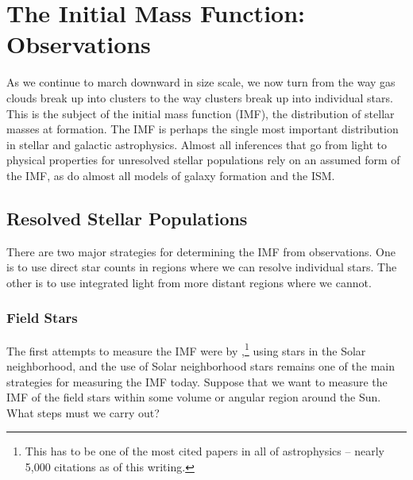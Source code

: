 \chapter{The Initial Mass Function: Observations}
\label{ch:imf_obs}



As we continue to march downward in size scale, we now turn from the way gas clouds break up into clusters to the way clusters break up into individual stars. This is the subject of the initial mass function (IMF), the distribution of stellar masses at formation. The IMF is perhaps the single most important distribution in stellar and galactic astrophysics. Almost all inferences that go from light to physical properties for unresolved stellar populations rely on an assumed form of the IMF, as do almost all models of galaxy formation and the ISM.

\section{Resolved Stellar Populations}

There are two major strategies for determining the IMF from observations. One is to use direct star counts in regions where we can resolve individual stars. The other is to use integrated light from more distant regions where we cannot.

\subsection{Field Stars}

The first attempts to measure the IMF were by \citet{salpeter55a},\footnote{This has to be one of the most cited papers in all of astrophysics -- nearly 5,000 citations as of this writing.} using stars in the Solar neighborhood, and the use of Solar neighborhood stars remains one of the main strategies for measuring the IMF today. Suppose that we want to measure the IMF of the field stars within some volume or angular region around the Sun. What steps must we carry out? 

